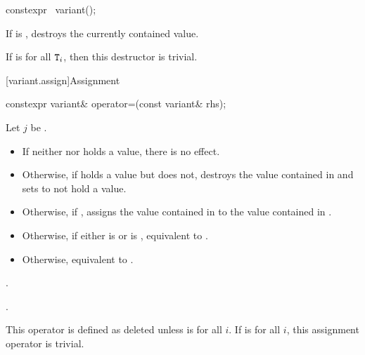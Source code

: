 %
\begin{itemdecl}
constexpr ~variant();
\end{itemdecl}

\begin{itemdescr}
\pnum
\effects
If  is ,
destroys the currently contained value.

\pnum
\remarks
If  is  for all $\texttt{T}_i$,
then this destructor is trivial.
\end{itemdescr}

[variant.assign]{Assignment}

%
\begin{itemdecl}
constexpr variant& operator=(const variant& rhs);
\end{itemdecl}

\begin{itemdescr}
\pnum
Let $j$ be .

\pnum
\effects
\begin{itemize}
\item
If neither  nor  holds a value, there is no effect.
\item
Otherwise, if  holds a value but  does not, destroys the value
contained in  and sets  to not hold a value.
\item
Otherwise, if , assigns the value contained in 
to the value contained in .
\item
Otherwise, if either 
is  or
 is ,
equivalent to .
\item
Otherwise, equivalent to .
\end{itemize}

\pnum
\ensures
{}.

\pnum
\returns
{}.

\pnum
\remarks
This operator is defined as deleted unless
is  for all $i$.
If 
is  for all $i$, this assignment operator is trivial.
\end{itemdescr}

